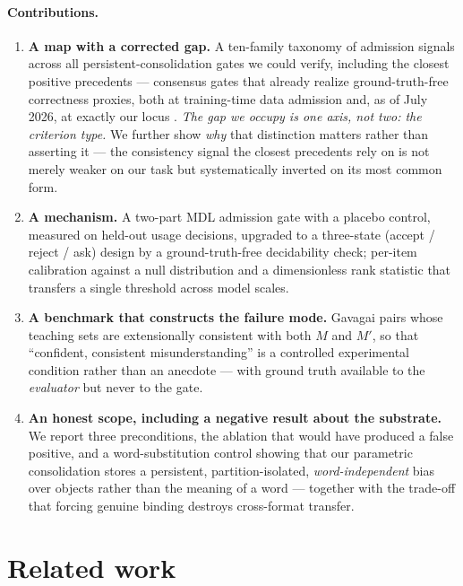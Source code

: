 \documentclass[11pt]{article}
\newcommand{\M}{\ensuremath{M}}
\newcommand{\Mp}{\ensuremath{M'}}
\begin{document}
\paragraph{Contributions.}
\begin{enumerate}\itemsep2pt
\item \textbf{A map with a corrected gap.} A ten-family taxonomy of admission signals
across all persistent-consolidation gates we could verify, including the closest positive
precedents --- consensus gates that already realize ground-truth-free correctness proxies,
both at training-time data admission
\citep{stein2026gates,huang2022selfimprove} and, as of July 2026, at exactly our locus
\citep{zhang2026consistencygate}. \emph{The gap we occupy is one axis, not two: the
criterion type.} We further show \emph{why} that distinction matters rather than asserting
it --- the consistency signal the closest precedents rely on is not merely weaker on our
task but systematically inverted on its most common form.

\item \textbf{A mechanism.} A two-part MDL admission gate with a placebo control, measured
on held-out usage decisions, upgraded to a three-state (accept / reject / ask) design by a
ground-truth-free decidability check; per-item calibration against a null distribution and
a dimensionless rank statistic that transfers a single threshold across model scales.

\item \textbf{A benchmark that constructs the failure mode.} Gavagai pairs whose teaching
sets are extensionally consistent with both \M{} and \Mp{}, so that ``confident, consistent
misunderstanding'' is a controlled experimental condition rather than an anecdote --- with
ground truth available to the \emph{evaluator} but never to the gate.

\item \textbf{An honest scope, including a negative result about the substrate.} We report
three preconditions, the ablation that would have produced a false positive, and a
word-substitution control showing that our parametric consolidation stores a persistent,
partition-isolated, \emph{word-independent} bias over objects rather than the meaning of a
word --- together with the trade-off that forcing genuine binding destroys cross-format
transfer.
\end{enumerate}

\section{Related work}
\label{sec:related}
\end{document}

